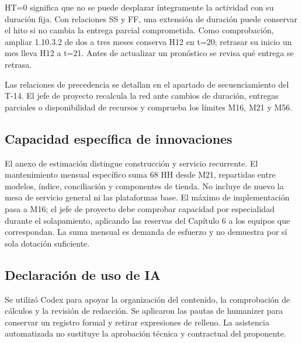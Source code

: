 HT=0 significa que no se puede desplazar íntegramente la actividad con su duración fija. Con relaciones SS y FF, una extensión de duración puede conservar el hito si no cambia la entrega parcial comprometida. Como comprobación, ampliar 1.10.3.2 de dos a tres meses conserva H12 en t=20; retrasar su inicio un mes lleva H12 a t=21. Antes de actualizar un pronóstico se revisa qué entrega se retrasa.


Las relaciones de precedencia se detallan en el apartado de secuenciamiento del T-14. El jefe de proyecto recalcula la red ante cambios de duración, entregas parciales o disponibilidad de recursos y comprueba los límites M16, M21 y M56.

\subsection{Capacidad específica de innovaciones}

El anexo de estimación distingue construcción y servicio recurrente. El mantenimiento mensual específico suma 68 HH desde M21, repartidas entre modelos, índice, conciliación y componentes de tienda. No incluye de nuevo la mesa de servicio general ni las plataformas base. El máximo de implementación pasa a M16; el jefe de proyecto debe comprobar capacidad por especialidad durante el solapamiento, aplicando las reservas del Capítulo 6 a los equipos que correspondan. La suma mensual es demanda de esfuerzo y no demuestra por sí sola dotación suficiente.

\subsection{Declaración de uso de IA}

Se utilizó Codex para apoyar la organización del contenido, la comprobación de cálculos y la revisión de redacción. Se aplicaron las pautas de humanizer para conservar un registro formal y retirar expresiones de relleno. La asistencia automatizada no sustituye la aprobación técnica y contractual del proponente.
